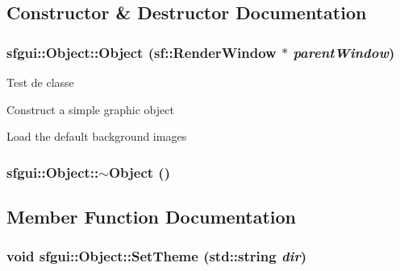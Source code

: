 \subsection{Constructor \& Destructor Documentation}
\hypertarget{classsfgui_1_1Object_f03d0a10a3f8f71c58f56cf896e95f82}{
\subsubsection[Object]{\setlength{\rightskip}{0pt plus 5cm}sfgui::Object::Object (sf::RenderWindow $\ast$ {\em parentWindow})}}
\label{classsfgui_1_1Object_f03d0a10a3f8f71c58f56cf896e95f82}


Test de classe 

Construct a simple graphic object

Load the default background images \hypertarget{classsfgui_1_1Object_7d923592a63a854c77ce4edcb21e40ba}{
\subsubsection[$\sim$Object]{\setlength{\rightskip}{0pt plus 5cm}sfgui::Object::$\sim$Object ()}}
\label{classsfgui_1_1Object_7d923592a63a854c77ce4edcb21e40ba}




\subsection{Member Function Documentation}
\hypertarget{classsfgui_1_1Object_96e00c4db6358d27ad806c0053e343a1}{
\subsubsection[SetTheme]{\setlength{\rightskip}{0pt plus 5cm}void sfgui::Object::SetTheme (std::string {\em dir})}}
\label{classsfgui_1_1Object_96e00c4db6358d27ad806c0053e343a1}




